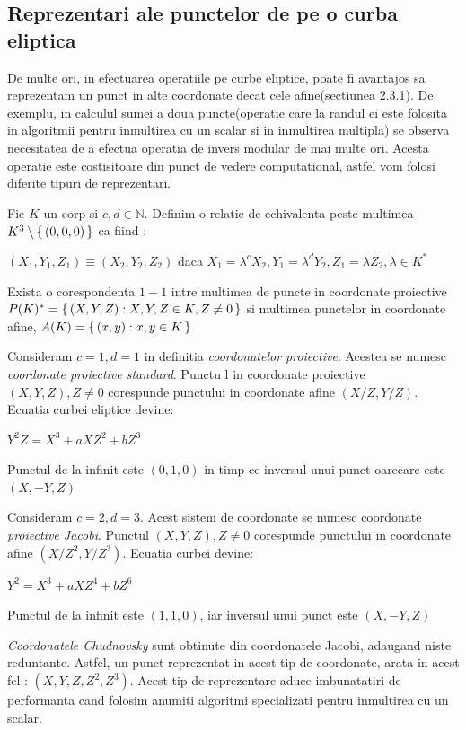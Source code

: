 \subsection{Reprezentari ale punctelor de pe o curba eliptica}
\label{subsec:subsec03}
De multe ori, in efectuarea operatiile pe curbe eliptice, poate fi avantajos sa reprezentam un punct in alte coordonate decat cele afine(sectiunea 2.3.1). De exemplu, in calculul sumei a doua puncte(operatie care la randul ei este folosita in algoritmii pentru inmultirea cu un scalar si in inmultirea multipla) se observa necesitatea de a efectua operatia de invers modular de mai multe ori. Acesta operatie este costisitoare din punct de vedere computational, astfel vom folosi diferite tipuri de reprezentari.
\begin{dfn}
Fie $K$ un corp si $c, d\in \mathbb{N}$. Definim o relatie de echivalenta peste multimea $K^3\setminus \set {(0, 0, 0)}$ ca fiind :
\begin{center} $(X_1, Y_1, Z_1) \equiv (X_2, Y_2, Z_2)$ daca $X_1 = \lambda ^cX_2, Y_1 = \lambda ^d Y_2, Z_1 = \lambda Z_2, \lambda\in K^{*}$\end{center}
Exista o corespondenta $1-1$ intre multimea de puncte in coordonate proiective $P(K)^{*} = \set {(X, Y, Z): X, Y, Z\in K, Z\neq 0}$ si multimea punctelor in coordonate afine, $A(K) = \set {(x, y): x, y\in K}$
\end{dfn}
\begin{dfn}
Consideram $c=1, d=1$ in definitia \textit{coordonatelor proiective}. Acestea se numesc \textit{coordonate proiective standard}. Punctu l in coordonate proiective $(X, Y, Z), Z\neq 0$ corespunde punctului in coordonate afine $(X/Z, Y/Z)$. Ecuatia curbei eliptice devine:
\begin{center}  $Y^2Z = X^3 + aXZ^2 + bZ^3$ \end{center}
Punctul de la infinit este $(0, 1, 0)$ in timp ce inversul unui punct oarecare este $(X, -Y, Z)$
\end{dfn}
\begin{dfn}
Consideram $c=2, d=3$. Acest sistem de coordonate se numesc coordonate \textit{proiective Jacobi}. Punctul $(X, Y, Z), Z\neq 0$ corespunde punctului 
in coordonate afine $(X/Z^2, Y/Z^3)$. Ecuatia curbei devine:
\begin{center} $Y^2 = X^3 + aXZ^4 + bZ^6$ \end{center}
Punctul de la infinit este $(1, 1, 0)$, iar inversul unui punct este $(X, -Y, Z)$
\end{dfn}
\begin{dfn}
\textit{Coordonatele Chudnovsky} sunt obtinute din coordonatele Jacobi, adaugand niste reduntante. Astfel, un punct reprezentat in acest tip de coordonate, arata in acest fel : $(X, Y, Z, Z^2, Z^3)$. Acest tip de reprezentare aduce imbunatatiri de performanta cand folosim anumiti algoritmi specializati pentru inmultirea cu un scalar.
\end{dfn}

